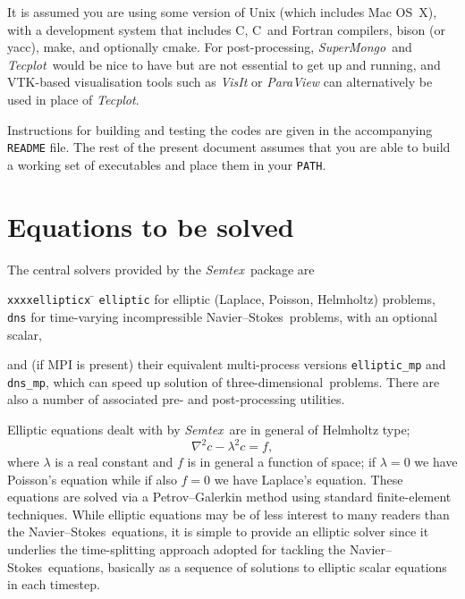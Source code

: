 \documentclass[11pt]{report}
\newcommand{\Semtex}{\emph{Semtex}} \newcommand{\Dog}{\emph{Dog}}
\newcommand{\SM}{\emph{SuperMongo}}
\newcommand{\Tecplot}{\emph{Tecplot}}
\newcommand\threed{three-di\-men\-sion\-al}
\newcommand\NavSto{Navier--Stokes}
\newcommand\cpp{C\nolinebreak\hspace{-.05em}\raisebox{.3ex}{\footnotesize\bf
+}\nolinebreak\hspace{-.10em}\raisebox{.3ex}{\footnotesize\bf+}}
\begin{document}
It is assumed you are using some version of Unix (which includes Mac
OS~X), with a development system that includes C, \cpp\ and Fortran
compilers, bison (or yacc), make, and optionally cmake. For
post-processing, \SM\ and \Tecplot\ would be nice to have but are
not essential to get up and running, and VTK-based visualisation tools
such as \emph{VisIt} or \emph{ParaView} can alternatively be used in
place of \Tecplot.

Instructions for building and testing the codes are given in the
accompanying \texttt{README} file.  The rest of the present document
assumes that you are able to build a working set of executables and
place them in your \texttt{PATH}.

\section{Equations to be solved}

The central solvers provided by the \Semtex\ package are
\begin{tabbing}
\texttt{xxxxellipticx} \= \kill
\hspace*{4ex}\texttt{elliptic} \> for elliptic (Laplace, Poisson, Helmholtz)
problems,\\
\hspace*{4ex}\texttt{dns} \> for time-varying incompressible
\NavSto\ problems, with an optional scalar,
\end{tabbing}
and (if MPI is present) their equivalent multi-process versions
\texttt{elliptic\_mp} and \texttt{dns\_mp}, which can speed up
solution of \threed\ problems.  There are also a number of associated
pre- and post-processing utilities.

Elliptic equations dealt with by \Semtex\ are in general of Helmholtz
type;
\begin{equation}
  \nabla^2 c - \lambda^2 c = f,
  \label{eq.elliptic}
\end{equation}
where $\lambda$ is a real constant and $f$ is in general a function of
space; if $\lambda=0$ we have Poisson's equation while if also $f=0$
we have Laplace's equation.  These equations are solved via a
Petrov--Galerkin method using standard finite-element techniques.
While elliptic equations may be of less interest to many readers than
the \NavSto\ equations, it is simple to provide an elliptic solver
since it underlies the time-splitting approach adopted for tackling
the \NavSto\ equations, \ie basically as a sequence of solutions to
elliptic scalar equations in each timestep.
\end{document}

